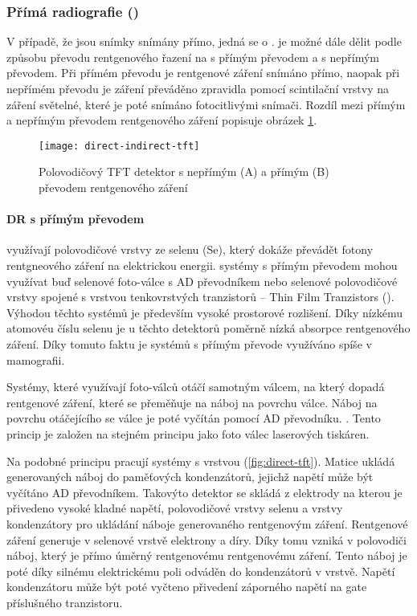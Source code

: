 \subsubsection{Přímá radiografie ()}
V případě, že jsou snímky snímány přímo, jedná se o .  je možné dále dělit podle způsobu převodu rentgenového řazení na  s přímým  převodem a  s nepřímým převodem. Při přímém převodu je rentgenové záření snímáno přímo, naopak při nepřímém převodu je záření převáděno zpravidla pomocí scintilační vrstvy na záření světelné, které je poté snímáno fotocitlivými snímači. Rozdíl mezi přímým a nepřímým převodem rentgenového záření popisuje obrázek \cref{fig:direct-indirect-tft}.

\begin{figure}[ht]
\centering
\texttt{[image: direct-indirect-tft]}
\caption{Polovodičový TFT detektor s nepřímým (A) a přímým (B) převodem rentgenového záření \cite[str.~511]{Radiation-Detection-and-Measurement}}
\label{fig:direct-indirect-tft}
\end{figure}

\paragraph{DR s přímým převodem}
využívají polovodičové vrstvy ze selenu (Se), který dokáže převádět fotony rentgneového záření na elektrickou energii.  systémy s přímým převodem mohou využívat buď selenové foto-válce s AD převodníkem nebo selenové polovodičové vrstvy spojené s vrstvou tenkovrstvých tranzistorů -- Thin Film Tranzistors (). \cite[str.~678]{Advances-in-Digital-Radiography} Výhodou těchto systémů je především vysoké prostorové rozlišení. Díky nízkému atomovéu číslu selenu je u těchto detektorů poměrně nízká absorpce rentgenového záření. Díky tomuto faktu je systémů s přímým převode využíváno spíše v mamografii. \cite[str~210]{Diagnostic-Radiology}

Systémy, které využívají foto-válců otáčí samotným válcem, na který dopadá rentgenové záření, které se přeměňuje na náboj na povrchu válce. Náboj na povrchu otáčejícího se válce je poté vyčítán pomocí AD převodníku. \cite[str.~677]{Advances-in-Digital-Radiography}. Tento princip je založen na stejném principu jako foto válec laserových tiskáren.
 
Na podobné principu pracují systémy s vrstvou  (\cref{fig:direct-tft}). Matice  ukládá generovaných náboj do paměťových kondenzátorů, jejichž napětí může být vyčítáno AD převodníkem. Takovýto detektor se skládá z elektrody na kterou je přivedeno vysoké kladné napětí, polovodičové vrstvy selenu a vrstvy  kondenzátory pro ukládání náboje generovaného rentgenovým záření. Rentgenové záření generuje v selenové vrstvě elektrony a díry. Díky tomu vzniká v polovodiči náboj, který je přímo úměrný rentgenovému rentgenovému záření. Tento náboj je poté díky silnému elektrickému poli odváděn do kondenzátorů v  vrstvě. Napětí kondenzátoru může být poté vyčteno přivedení záporného napětí na gate příslušného tranzistoru.

